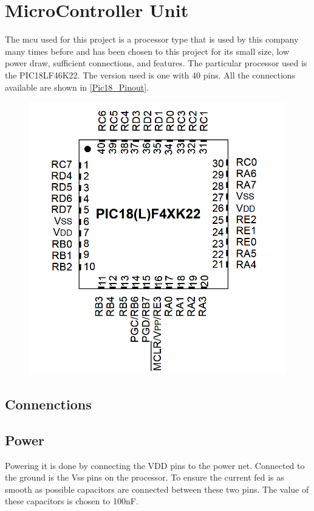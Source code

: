 


\section{MicroController Unit}
The \gls{mcu} used for this project is a processor type that is used by this company many times before and has been chosen to this project for its small size, low power draw, sufficient connections, and features. The particular processor used is the PIC18LF46K22\cite{pic18}. The version used is one with 40 pins. All the connections available are shown in \autoref{Pic18_Pinout}.

\begin{figure}[H] 
\centering 
\includegraphics[width=.7\linewidth]{Figures/Pic18_pinout} 
\label{Pic18_Pinout} 
\end{figure} 

\subsection{Connenctions}

 \subsection{Power}
Powering it is done by connecting the VDD pins to the power net. Connected to the ground is the Vss pins on the processor. To ensure the current fed is as smooth as possible capacitors are connected between these two pins. The value of these capacitors is chosen to 100nF.  

